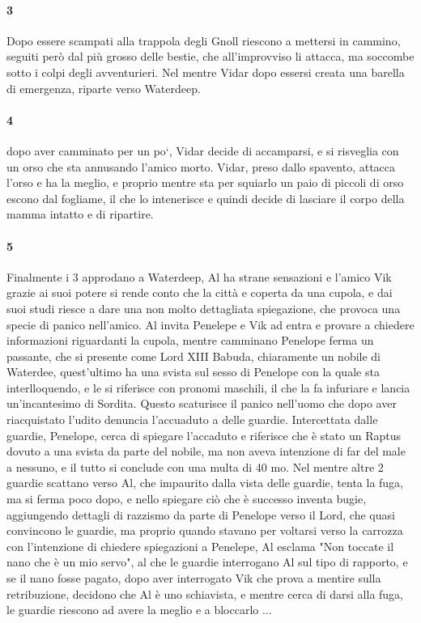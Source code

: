 \documentclass{article}
\begin{document}
                  \paragraph{3} Dopo essere scampati alla trappola degli Gnoll riescono a mettersi in cammino, seguiti però dal più grosso delle bestie, che all'improvviso li attacca, ma soccombe sotto i colpi degli avventurieri. Nel mentre Vidar dopo essersi creata una barella di emergenza, riparte verso Waterdeep. 
                  \paragraph{4} dopo aver camminato per un po`, Vidar decide di accamparsi, e si risveglia con un orso che sta annusando l'amico morto. Vidar, preso dallo spavento, attacca l'orso e ha la meglio, e proprio mentre sta per squiarlo un paio di piccoli di orso escono dal fogliame, il che lo intenerisce e quindi decide di lasciare il corpo della mamma intatto e di ripartire. 
                  \paragraph{5} Finalmente i 3 approdano a Waterdeep, Al ha strane sensazioni e l'amico Vik grazie ai suoi potere si rende conto che la città e coperta da una cupola, e dai suoi studi riesce a dare una non molto dettagliata spiegazione, che provoca una specie di panico nell'amico. Al invita Penelepe e Vik ad entra e provare a chiedere informazioni riguardanti la cupola, mentre camminano Penelope ferma un passante, che si presente come Lord XIII Babuda, chiaramente un nobile di Waterdee, quest'ultimo ha una svista sul sesso di Penelope con la quale sta interlloquendo, e le si riferisce con pronomi maschili, il che la fa infuriare e lancia un'incantesimo di Sordita. Questo scaturisce il panico nell'uomo che dopo aver riacquistato l'udito denuncia l'accuaduto a delle guardie. Intercettata dalle guardie, Penelope, cerca di spiegare l'accaduto e riferisce che è stato un Raptus dovuto a una svista da parte del nobile, ma non aveva intenzione di far del male a nessuno, e il tutto si conclude con una multa di 40 mo. Nel mentre altre 2 guardie scattano verso Al, che impaurito dalla vista delle guardie, tenta la fuga, ma si ferma poco dopo, e nello spiegare ciò che è successo inventa bugie, aggiungendo dettagli di razzismo da parte di Penelope verso il Lord,  che quasi convincono le guardie, ma proprio quando stavano per voltarsi verso la carrozza con l'intenzione di chiedere spiegazioni a Penelepe, Al esclama "Non toccate il nano che è un mio servo", al che le guardie interrogano Al sul tipo di rapporto, e se il nano fosse pagato, dopo aver interrogato Vik che prova a mentire sulla retribuzione, decidono che Al è uno schiavista, e mentre cerca di darsi alla fuga, le guardie riescono ad avere la meglio e a bloccarlo ...    
\end{document}
